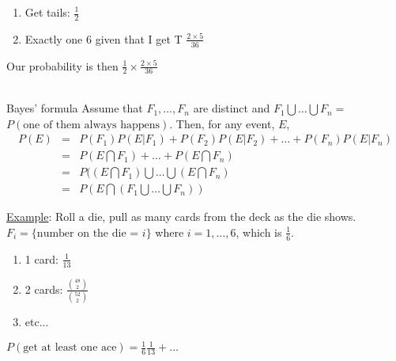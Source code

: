   \begin{enumerate}
    \item Get tails: $\frac{1}{2}$
    \item Exactly one 6 given that I get T $\frac{2 \times 5}{36}$
  \end{enumerate}
  Our probability is then $\frac{1}{2} \times \frac{2 \times 5}{36}$\\\\
  \begin{theorem}{Bayes' formula}
    Assume that $F_1, \ldots, F_n$ are distinct and $F_1 \bigcup \ldots \bigcup
    F_n =$\\
    $P(\text{one of them always happens})$. Then, for any event, $E$,
    \begin{eqnarray*}
    P(E) & = & P(F_1)P(E|F_1) + P(F_2)P(E|F_2) + \ldots + P(F_n)P(E | F_n)\\
    & = & P(E \bigcap F_1) + \ldots + P(E \bigcap F_n)\\
    & = & P((E \bigcap F_1) \bigcup \ldots \bigcup (E \bigcap F_n)\\
    & = & P(E \bigcap (F_1 \bigcup \ldots \bigcup F_n))
    \end{eqnarray*}
  \end{theorem}
  \underline{Example}: Roll a die, pull as many cards from the deck as the 
  die shows.\\
  $F_i = \{ \text{number on the die = $i$} \}$ where $i = 1, \ldots, 6$, which
  is $\frac{1}{6}$.
  \begin{enumerate}
    \item 1 card: $\frac{1}{13}$
    \item 2 cards: $\frac{\binom{48}{2}}{\binom{52}{2}}$
    \item etc...
  \end{enumerate}
  $P(\text{get at least one ace}) = \frac{1}{6}  \frac{1}{13} + \ldots$\\
